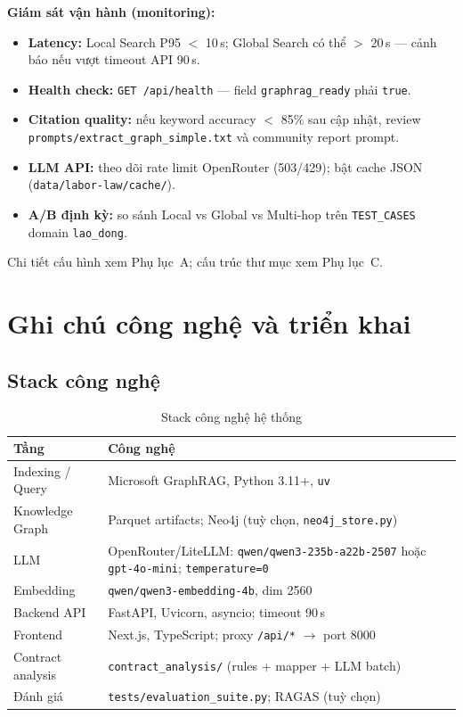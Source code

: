 \documentclass[../DoAn.tex]{subfiles}
\begin{document}
\textbf{Giám sát vận hành (monitoring):}
\begin{itemize}[nosep, leftmargin=*]
    \item \textbf{Latency:} Local Search P95 $<$ 10\,s; Global Search có thể $>$ 20\,s --- cảnh báo nếu vượt timeout API 90\,s.
    \item \textbf{Health check:} \texttt{GET /api/health} --- field \texttt{graphrag\_ready} phải \texttt{true}.
    \item \textbf{Citation quality:} nếu keyword accuracy $<$ 85\% sau cập nhật, review \texttt{prompts/extract\_graph\_simple.txt} và community report prompt.
    \item \textbf{LLM API:} theo dõi rate limit OpenRouter (503/429); bật cache JSON (\texttt{data/labor-law/cache/}).
    \item \textbf{A/B định kỳ:} so sánh Local vs Global vs Multi-hop trên \texttt{TEST\_CASES} domain \texttt{lao\_dong}.
\end{itemize}

Chi tiết cấu hình xem Phụ lục~A; cấu trúc thư mục xem Phụ lục~C.

\section{Ghi chú công nghệ và triển khai}
\label{section:7.3}

\subsection{Stack công nghệ}
\label{subsection:7.3.1}

\begin{table}[H]
\centering
\caption{Stack công nghệ hệ thống}
\label{table:tech_stack}
\small
\begin{tabular}{|l|p{8cm}|}
\hline
\textbf{Tầng} & \textbf{Công nghệ} \\
\hline
Indexing / Query & Microsoft GraphRAG, Python 3.11+, \texttt{uv} \\
Knowledge Graph & Parquet artifacts; Neo4j (tuỳ chọn, \texttt{neo4j\_store.py}) \\
LLM & OpenRouter/LiteLLM: \texttt{qwen/qwen3-235b-a22b-2507} hoặc \texttt{gpt-4o-mini}; \texttt{temperature=0} \\
Embedding & \texttt{qwen/qwen3-embedding-4b}, dim 2560 \\
Backend API & FastAPI, Uvicorn, asyncio; timeout 90\,s \\
Frontend & Next.js, TypeScript; proxy \texttt{/api/*} $\rightarrow$ port 8000 \\
Contract analysis & \texttt{contract\_analysis/} (rules + mapper + LLM batch) \\
Đánh giá & \texttt{tests/evaluation\_suite.py}; RAGAS (tuỳ chọn) \\
\hline
\end{tabular}
\end{table}
\end{document}
